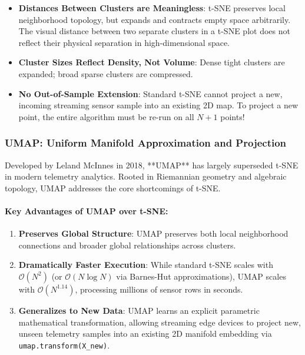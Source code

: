 \begin{warning}
\begin{itemize}
    \item \textbf{Distances Between Clusters are Meaningless}: t-SNE preserves local neighborhood topology, but expands and contracts empty space arbitrarily. The visual distance between two separate clusters in a t-SNE plot does not reflect their physical separation in high-dimensional space.
    \item \textbf{Cluster Sizes Reflect Density, Not Volume}: Dense tight clusters are expanded; broad sparse clusters are compressed.
    \item \textbf{No Out-of-Sample Extension}: Standard t-SNE cannot project a new, incoming streaming sensor sample into an existing 2D map. To project a new point, the entire algorithm must be re-run on all $N+1$ points!
\end{itemize}
\end{warning}

\subsubsection{UMAP: Uniform Manifold Approximation and Projection}
Developed by Leland McInnes in 2018, **UMAP** has largely superseded t-SNE in modern telemetry analytics. Rooted in Riemannian geometry and algebraic topology, UMAP addresses the core shortcomings of t-SNE.

\paragraph{Key Advantages of UMAP over t-SNE:}
\begin{enumerate}
    \item \textbf{Preserves Global Structure}: UMAP preserves both local neighborhood connections and broader global relationships across clusters.
    \item \textbf{Dramatically Faster Execution}: While standard t-SNE scales with $\mathcal{O}(N^2)$ (or $\mathcal{O}(N \log N)$ via Barnes-Hut approximations), UMAP scales with $\mathcal{O}(N^{1.14})$, processing millions of sensor rows in seconds.
    \item \textbf{Generalizes to New Data}: UMAP learns an explicit parametric mathematical transformation, allowing streaming edge devices to project new, unseen telemetry samples into an existing 2D manifold embedding via \texttt{umap.transform(X\_new)}.
\end{enumerate}

